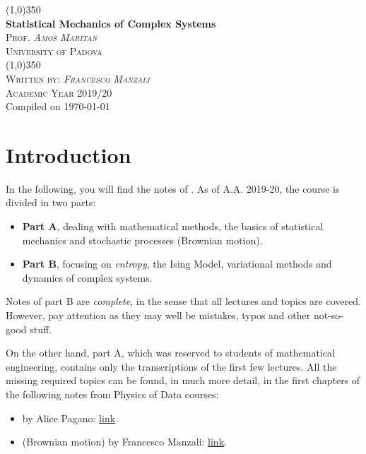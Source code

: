 \documentclass[12pt,a4paper]{report} %
\begin{document}
\begin{center}
                \line (1,0){350} \\
                \huge{\bfseries Statistical Mechanics of Complex Systems}\\
                [2mm]
                \textsc{\normalsize Prof. \textit{Amos Maritan}}
                \vspace{-0.5em}\\
                \textsc{\normalsize University of Padova}\\
                \vspace{-1em}
                \line (1,0){350} \\
        [0.2cm]
        \textsc{\normalsize Written by: \textit{Francesco Manzali}}\\
                \textsc{\normalsize Academic Year 2019/20}\\ 
        {\scriptsize Compiled on \today}\\
        [0.2cm]
        {\scriptsize \doclicenseLongText}
\end{center}


\tableofcontents 
{}

\clearpage
\section*{Introduction}
In the following, you will find the notes of . As of A.A. 2019-20, the course is divided in two parts:
\begin{itemize}
        \item \textbf{Part A}, dealing with mathematical methods, the basics of statistical mechanics and stochastic processes (Brownian motion).
        \item \textbf{Part B}, focusing on \textit{entropy}, the Ising Model, variational methods and dynamics of complex systems.
\end{itemize}
Notes of part B are \textit{complete}, in the sense that all lectures and topics are covered. However, pay attention as they may well be mistakes, typos and other not-so-good stuff.

On the other hand, part A, which was reserved to students of mathematical engineering, contains only the transcriptions of the first few lectures. All the missing required topics can be found, in much more detail, in the first chapters of the following notes from Physics of Data courses:
\begin{itemize}
        \item {} by Alice Pagano: \href{https://github.com/AlicePagano/Lectures-Statistical-Mechanics}{link}.
        \item {} (Brownian motion) by Francesco Manzali: \href{https://www.overleaf.com/read/hwzmdmrmmhzn}{link}.
\end{itemize}
\end{document}
